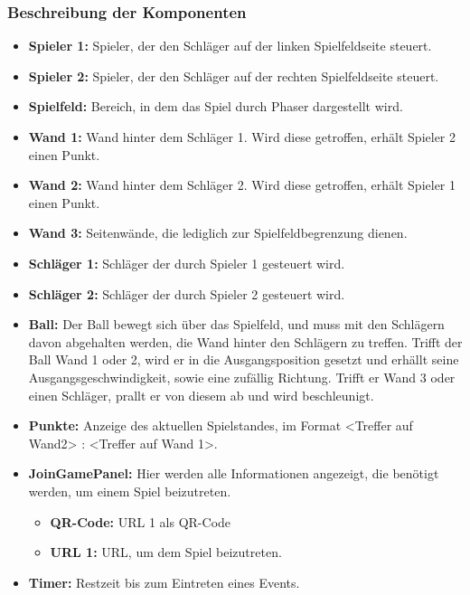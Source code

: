 		\subsubsection{Beschreibung der Komponenten}
		\begin{itemize}
			\item \textbf{Spieler 1:} Spieler, der den Schläger auf der linken Spielfeldseite steuert.
			\item \textbf{Spieler 2:} Spieler, der den Schläger auf der rechten Spielfeldseite steuert.
			\item \textbf{Spielfeld:} Bereich, in dem das Spiel durch Phaser dargestellt wird.
			\item \textbf{Wand 1:} Wand hinter dem Schläger 1. Wird diese getroffen, erhält Spieler 2 einen Punkt.
			\item \textbf{Wand 2:} Wand hinter dem Schläger 2. Wird diese getroffen, erhält Spieler 1 einen Punkt.
			\item \textbf{Wand 3:} Seitenwände, die lediglich zur Spielfeldbegrenzung dienen.
			\item \textbf{Schläger 1:} Schläger der durch Spieler 1 gesteuert wird.
			\item \textbf{Schläger 2:} Schläger der durch Spieler 2 gesteuert wird.
			\item \textbf{Ball:} Der Ball bewegt sich über das Spielfeld, und muss mit den Schlägern davon abgehalten werden, die Wand hinter den Schlägern zu treffen. Trifft der Ball Wand 1 oder 2, wird er in die Ausgangsposition gesetzt und erhällt seine Ausgangsgeschwindigkeit, sowie eine zufällig Richtung. Trifft er Wand 3 oder einen Schläger, prallt er von diesem ab und wird beschleunigt.
			\item \textbf{Punkte:} Anzeige des aktuellen Spielstandes, im Format <Treffer auf Wand2> : <Treffer auf Wand 1>.
			\item \textbf{JoinGamePanel:} Hier werden alle Informationen angezeigt, die benötigt werden, um einem Spiel beizutreten.
			\begin{itemize}
				\item \textbf{QR-Code:} URL 1 als QR-Code
				\item \textbf{URL 1:} URL, um dem Spiel beizutreten.
			\end{itemize}
			\item \textbf{Timer:} Restzeit bis zum Eintreten eines Events.
		\end{itemize}
